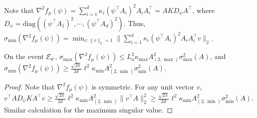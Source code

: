 Note that $\nabla^2f_{\mu}(\psi) = \sum_{i=1}^{d} \kappa_i(\psi^{\top}A_i)^2A_iA_i^{\top} = AKD_{\psi}A^{\top}$,  where $D_{\psi} = \text{diag}\left((\psi^{\top}A_1)^2,\cdots, (\psi^{\top}A_d)^2\right)$. 
Thus, $\sigma_{\min}(\nabla^2f_{\mu}(\psi)) = \min_{v:\|v\|_2=1}\|\sum_{i=1}^{d} \kappa_i(\psi^{\top}A_i)^2A_iA_i^{\top}v\|_2$. 
\begin{lemma}
\label{lem:boundsigmaminnabla}
On the event $\mathcal{E}_{\psi}$, $\sigma_{\max}(\nabla^2f_{\mu}(\psi)) \le L_u^2 \kappa_{\max}A^2_{(2,\max)}\sigma_{\max}^2(A)$, and
 $\sigma_{\min}(\nabla^2f_{\mu}(\psi)) \ge \frac{\sqrt{2\pi}}{2d} \ell^2\kappa_{\min}A^2_{(2,\min)}\sigma_{\min}^2(A)$.
\end{lemma}
\begin{proof}
Note that $\nabla^2f_{\mu}(\psi)$ is symmetric. 
For any unit vector $v$, $v^{\top}AD_{\psi}KA^{\top}v \ge \frac{\sqrt{2\pi}}{2d}\ell^2\kappa_{\min} A^2_{(2,\min)}\|v^{\top}A\|_2^2 \ge \frac{\sqrt{2\pi}}{2d}\ell^2\kappa_{\min}A^2_{(2,\min)}\sigma_{\min}^2(A)$. Similar calculation for the maximum singular value.
\end{proof}

